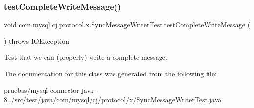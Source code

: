 \subsubsection{\texorpdfstring{test\+Complete\+Write\+Message()}{testCompleteWriteMessage()}}
{\footnotesize\ttfamily void com.\+mysql.\+cj.\+protocol.\+x.\+Sync\+Message\+Writer\+Test.\+test\+Complete\+Write\+Message (\begin{DoxyParamCaption}{ }\end{DoxyParamCaption}) throws I\+O\+Exception}

Test that we can (properly) write a complete message. 

The documentation for this class was generated from the following file\+:\begin{DoxyCompactItemize}
\item 
pruebas/mysql-\/connector-\/java-\/8../src/test/java/com/mysql/cj/protocol/x/Sync\+Message\+Writer\+Test.\+java\end{DoxyCompactItemize}
